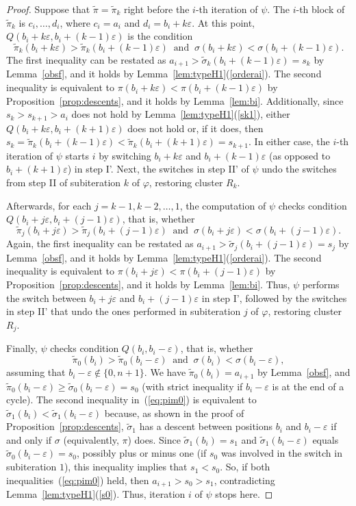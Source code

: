 \documentclass[11pt]{amsart}
\newcommand\beq{\begin{equation}}
\newcommand\eeq{\end{equation}}
\newcommand\wt{\widetilde}
\newcommand\bij{\varphi}
\newcommand\inv{\psi}
\newcommand\eps{\varepsilon}
\newcommand\sigm{\wt\sigma}
\newcommand\pim{\wt\pi}
\begin{document}
\begin{proof}
Suppose that $\pim=\pim_k$ right before the $i$-th iteration of $\inv$. The $i$-th block of $\pim_k$ is $c_i,\dots,d_i$,
where $c_i=a_i$ and $d_i=b_i+k\eps$. At this point, $Q(b_i+k\eps,b_i+(k{-}1)\eps)$ is the condition $$\pim_k(b_i+k\eps)>\pim_k(b_i+(k{-}1)\eps)\ \textrm{ and }\ \sigma(b_i+k\eps)<\sigma(b_i+(k{-}1)\eps).$$
The first inequality can be restated as $a_{i+1}>\sigm_k(b_i+(k{-}1)\eps)=s_k$ by Lemma~\ref{obsf}, and it holds by Lemma~\ref{lem:typeH1}(\ref{orderai}).
The second inequality is equivalent to $\pi(b_i+k\eps)<\pi(b_i+(k{-}1)\eps)$ by Proposition~\ref{prop:descents},
and it holds by Lemma~\ref{lem:bi}. Additionally, since $s_k>s_{k+1}>a_i$ does not hold by Lemma~\ref{lem:typeH1}(\ref{sk1}),
either $Q(b_i+k\eps,b_i+(k{+}1)\eps)$ does not hold or, if it does, then $s_k=\pim_k(b_i+(k{-}1)\eps)<\pim_k(b_i+(k{+}1)\eps)=s_{k+1}$. In either case, the $i$-th iteration of $\inv$ starts
 $i$ by switching $b_i+k\eps$ and $b_i+(k{-}1)\eps$ (as opposed to $b_i+(k{+}1)\eps$) in step I'.
Next, the switches in step II' of $\inv$ undo the switches from step II of subiteration $k$ of $\bij$, restoring cluster $R_k$.

Afterwards, for each $j=k{-}1,k{-}2,\dots,1$, the computation of $\inv$ checks condition $Q(b_i+j\eps,b_i+(j{-}1)\eps)$, that is, whether $$\pim_j(b_i+j\eps)>\pim_j(b_i+(j{-}1)\eps)\ \textrm{ and }\ \sigma(b_i+j\eps)<\sigma(b_i+(j{-}1)\eps).$$
Again, the first inequality can be restated as $a_{i+1}>\sigm_j(b_i+(j{-}1)\eps)=s_j$ by Lemma~\ref{obsf}, and it holds by Lemma~\ref{lem:typeH1}(\ref{orderai}). The second inequality is equivalent to $\pi(b_i+j\eps)<\pi(b_i+(j{-}1)\eps)$ by Proposition~\ref{prop:descents}, and it holds by Lemma~\ref{lem:bi}. Thus, $\inv$ performs the switch between $b_i+j\eps$ and $b_i+(j{-}1)\eps$ in step I', followed by the switches in step II' that undo the ones performed in subiteration $j$ of $\bij$, restoring cluster $R_j$.

Finally, $\inv$ checks condition $Q(b_i,b_i-\eps)$, that is, whether \beq\label{eq:pim0}\pim_0(b_i)>\pim_0(b_i-\eps)\ \textrm{ and }\ \sigma(b_i)<\sigma(b_i-\eps),\eeq assuming that $b_i-\eps\notin\{0,n+1\}$.
We have $\pim_0(b_i)=a_{i+1}$ by Lemma~\ref{obsf}, and $\pim_0(b_i-\eps)\ge\sigm_0(b_i-\eps)=s_0$ (with strict inequality if $b_i-\eps$ is at the end of a cycle).
The second inequality in~(\ref{eq:pim0})
is equivalent to $\sigm_1(b_i)<\sigm_1(b_i-\eps)$ because, as shown in the proof of Proposition~\ref{prop:descents},
$\sigm_1$ has a descent between positions $b_i$ and $b_i-\eps$ if and only if $\sigma$ (equivalently, $\pi$) does. Since $\sigm_1(b_i)=s_1$ and $\sigm_1(b_i-\eps)$ equals $\sigm_0(b_i-\eps)=s_0$, possibly plus or minus one (if $s_0$
was involved in the switch in subiteration $1$), this inequality implies that $s_1<s_0$.
So, if both inequalities~(\ref{eq:pim0}) held, then $a_{i+1}>s_0>s_1$, contradicting Lemma~\ref{lem:typeH1}(\ref{s0}). Thus, iteration $i$ of $\inv$ stops here.
\end{proof}
\end{document}
